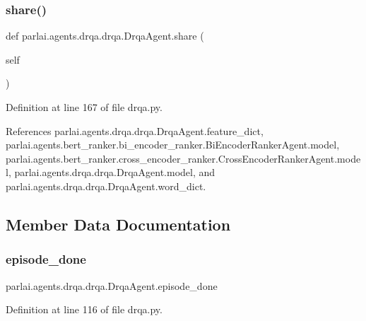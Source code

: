 \subsubsection{\texorpdfstring{share()}{share()}}
{\footnotesize\ttfamily def parlai.\+agents.\+drqa.\+drqa.\+Drqa\+Agent.\+share (\begin{DoxyParamCaption}\item[{}]{self }\end{DoxyParamCaption})}



Definition at line 167 of file drqa.\+py.



References parlai.\+agents.\+drqa.\+drqa.\+Drqa\+Agent.\+feature\+\_\+dict, parlai.\+agents.\+bert\+\_\+ranker.\+bi\+\_\+encoder\+\_\+ranker.\+Bi\+Encoder\+Ranker\+Agent.\+model, parlai.\+agents.\+bert\+\_\+ranker.\+cross\+\_\+encoder\+\_\+ranker.\+Cross\+Encoder\+Ranker\+Agent.\+model, parlai.\+agents.\+drqa.\+drqa.\+Drqa\+Agent.\+model, and parlai.\+agents.\+drqa.\+drqa.\+Drqa\+Agent.\+word\+\_\+dict.



\subsection{Member Data Documentation}
\mbox{\label{classparlai_1_1agents_1_1drqa_1_1drqa_1_1DrqaAgent_a313e13a6e6d878e5e37c5d27d8daed78}} 
\subsubsection{\texorpdfstring{episode\+\_\+done}{episode\_done}}
{\footnotesize\ttfamily parlai.\+agents.\+drqa.\+drqa.\+Drqa\+Agent.\+episode\+\_\+done}



Definition at line 116 of file drqa.\+py.




